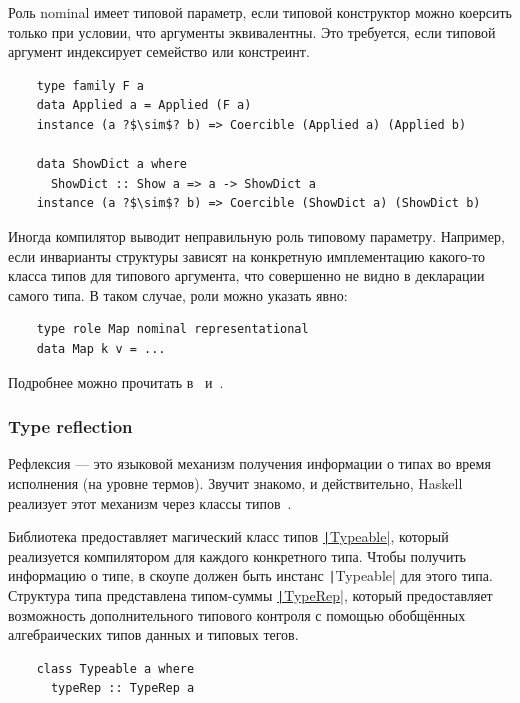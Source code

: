 Роль nominal имеет типовой параметр, если типовой конструктор можно коерсить только при условии, что аргументы эквивалентны.
Это требуется, если типовой аргумент индексирует семейство или констреинт.
\begin{verbatim}
    type family F a
    data Applied a = Applied (F a)
    instance (a ?$\sim$? b) => Coercible (Applied a) (Applied b)

    data ShowDict a where
      ShowDict :: Show a => a -> ShowDict a
    instance (a ?$\sim$? b) => Coercible (ShowDict a) (ShowDict b)
\end{verbatim}

Иногда компилятор выводит неправильную роль типовому параметру.
Например, если инварианты структуры зависят на конкретную имплементацию какого-то класса типов для типового аргумента, что совершенно не видно в декларации самого типа.
В таком случае, роли можно указать явно:
\begin{verbatim}
    type role Map nominal representational
    data Map k v = ...
\end{verbatim}

Подробнее можно прочитать в~\cite{breitner2014safe} и~\cite[глава 8]{maguire-types}.

\subsubsection{Type reflection}

Рефлексия --- это языковой механизм получения информации о типах во время исполнения (на уровне термов).
Звучит знакомо, и действительно, Haskell реализует этот механизм через классы типов~\cite{peyton2016reflection}.

Библиотека предоставляет магический класс типов \href{https://hackage.haskell.org/package/base-4.20.0.1/docs/Type-Reflection.html}{\texttt|Typeable|}, который реализуется компилятором для каждого конкретного типа.
Чтобы получить информацию о типе, в скоупе должен быть инстанс \texttt|Typeable| для этого типа.
Структура типа представлена типом-суммы \href{https://hackage.haskell.org/package/ghc-internal-9.1001.0/docs/src/GHC.Internal.Data.Typeable.Internal.html#TypeRep}{\texttt|TypeRep|}, который предоставляет возможность дополнительного типового контроля с помощью обобщённых алгебраических типов данных и типовых тегов.
\begin{verbatim}
    class Typeable a where
      typeRep :: TypeRep a
\end{verbatim}

